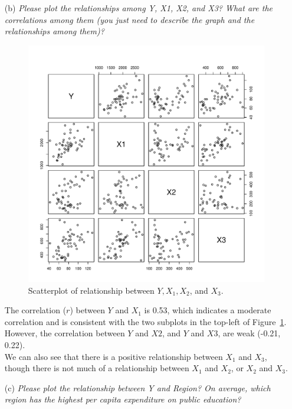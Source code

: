 \documentclass[12pt,letterpaper]{article}
\begin{document}
\begin{itemize}
\item [(b)] 
\emph{Please plot the relationships among \emph{Y}, \emph{X1}, \emph{X2}, and \emph{X3}? What are the correlations among them (you just need to describe the graph and the relationships among them)?}

  
\vspace{.25cm}

\begin{figure}[h!]\centering

	\caption{\footnotesize Scatterplot of relationship between $Y, X_1, X_2$, and $X_3$.}
		\label{fig:plot_3b}
	\includegraphics[width=.85\textwidth]{plot_2a.pdf}
\end{figure}

The correlation ($r$) between $Y$ and $X_1$ is 0.53, which indicates a moderate correlation and is consistent with the two subplots in the top-left of Figure~\ref{fig:plot_3b}. However, the correlation between $Y$ and $X2$, and $Y$ and $X3$, are weak (-0.21, 0.22).\\

We can also see that there is a positive relationship between $X_1$ and $X_3$, though there is not much of a relationship between $X_1$ and $X_2$, or $X_2$ and $X_3$. 

\vspace*{1cm}
\item [(c)]
\emph{Please plot the relationship between \emph{Y} and \emph{Region}? On average, which region has the highest per capita expenditure on public education?}


\end{itemize}
\end{document}
